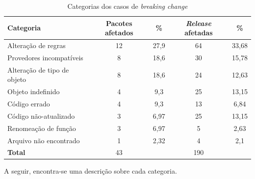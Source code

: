 \begin{table}[]
\begin{tabular}{|l|c|c|c|c|}
\hline
\centering
\textbf{Categoria}           & \textbf{Pacotes afetados} & \textbf{\%}   & \textbf{\textit{Release} afetadas} & \textbf{\%}    \\ \hline
Alteração de regras          & 12              & 27,9 & 64                          & 33,68 \\
Provedores incompatíveis     & 8               & 18,6 & 30                          & 15,78 \\
Alteração de tipo de objeto  & 8               & 18,6 & 24                          & 12,63 \\
Objeto indefinido            & 4               & 9,3  & 25                          & 13,15 \\
Código errado                & 4               & 9,3  & 13                          & 6,84  \\
Código não-atualizado        & 3               & 6,97 & 25                          & 13,15  \\
Renomeação de função         & 3               & 6,97 & 5                           & 2,63  \\
Arquivo não encontrado       & 1               & 2,32 & 4                           & 2,1  \\ \hline
\textbf{Total}               & 43              &      & 190                         &       \\ \hline
\end{tabular}
\caption{Categorias dos casos de \textit{breaking change}}
\label{tab:bc_category}
\end{table}

A seguir, encontra-se uma descrição sobre cada categoria.

